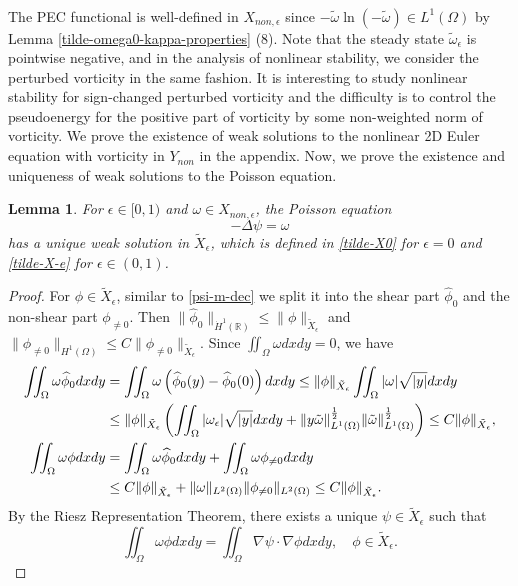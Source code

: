 \documentclass[1 [leqno, 11pt]{amsart}
\numberwithin{equation}{section}
\let\ep=\epsilon
\newtheorem{lemma}[Theorem]{Lemma}
\begin{document}
\begin{CJK*}{GBK}{song}
\begin{align*}
\end{align*}
The  PEC functional is well-defined in $X_{non,\ep}$ since
 $-\tilde \omega\ln(-\tilde \omega)\in L^1(\Omega)$ by Lemma \ref{tilde-omega0-kappa-properties} (8).
Note that the steady state  $\tilde \omega_\ep$ is pointwise negative, and  in the analysis of nonlinear stability, we consider the perturbed vorticity in the same fashion.
It is interesting to study nonlinear stability for  sign-changed  perturbed vorticity and the difficulty is to control the pseudoenergy for the positive part of vorticity by some non-weighted norm of vorticity.
 \fi
We prove the existence of weak solutions to the nonlinear 2D Euler equation with  vorticity in $Y_{non}$ in the appendix.
Now, we prove the existence and uniqueness of weak solutions to the Poisson equation.
\begin{lemma}\label{well-poseness-Poisson-equation-nonlinear-case}
For $\ep\in[0,1)$ and $\omega \in X_{non,\ep}$, the Poisson equation
$$-\Delta \psi = \omega$$
has a unique weak solution in $\tilde{X}_\ep$, which is defined in \eqref{tilde-X0} for $\ep=0$ and \eqref{tilde-X-e} for $\ep\in(0,1)$.
\end{lemma}
\begin{proof}
For $\phi \in \tilde{X}_\ep$, similar to \eqref{psi-m-dec} we split it into the shear part  $ \widehat\phi_0 $ and the non-shear part $\phi_{\neq0}$. Then
$\|\widehat{\phi}_0\|_{\dot{H}^1(\mathbb{R})}\leq \|\phi\|_{\tilde{X}_\ep}$ and   $\|\phi_{\neq0}\|_{H^1(\Omega)}\leq C\|\phi_{\neq0}\|_{\tilde{X}_\ep}.$
Since $\iint_{\Omega}\omega dxdy=0$, we have
\begin{align*}\iint_{\Omega} \omega\widehat{\phi}_0 dxdy& = \iint_{\Omega} \omega \left(\widehat{\phi}_0(y)-\widehat{\phi}_0(0)\right) dxdy \leq
\|\phi\|_{\tilde{X}_\ep}\iint_{\Omega} |\omega| \sqrt{|y|} dxdy\\
&\leq\|\phi\|_{\tilde{X}_\ep}\left(\iint_\Omega|\omega_\ep|\sqrt{|y|}dxdy+\|y\tilde \omega \|_{L^1(\Omega)}^{1\over2}\|\tilde \omega\|_{L^1(\Omega)}^{1\over2}\right)
\leq C\|\phi\|_{\tilde{X}_\ep},\\
\iint_{\Omega} \omega \phi dxdy
& = \iint_{\Omega} \omega \widehat\phi_0 dxdy + \iint_{\Omega} \omega \phi_{\neq0} dxdy \\
& \leq C\|\phi\|_{\tilde{X}_\ep} + \|\omega\|_{L^2(\Omega)}  \|\phi_{\neq0}\|_{L^2(\Omega)}\leq C\|\phi\|_{\tilde{X}_\ep}.
\end{align*}
By the Riesz Representation Theorem, there exists a unique $\psi \in \tilde{X}_\ep$ such that
$$\iint_{\Omega} \omega \phi dxdy = \iint_{\Omega}\nabla \psi \cdot \nabla\phi dxdy,\quad \phi \in \tilde{X}_\ep.$$
\end{proof}


\end{CJK*}
\end{document}
